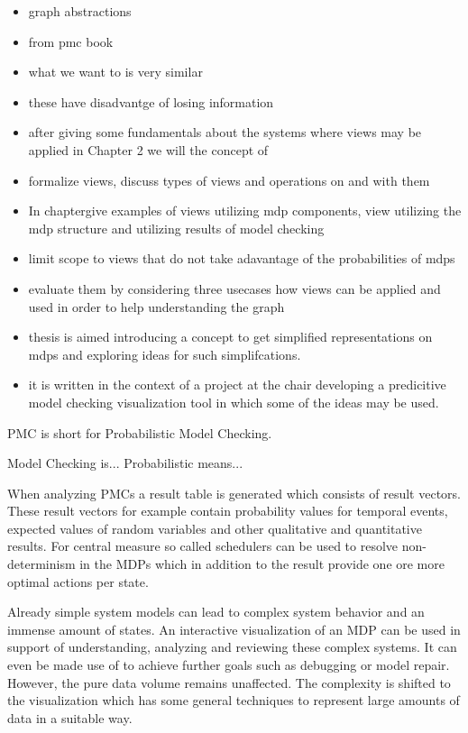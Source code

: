 \documentclass[preview]{standalone}
\begin{document}
\begin{itemize}
			\item graph abstractions
			\item from pmc book
			\item what we want to is very similar
			\item these have disadvantge of losing information
			\item after giving some fundamentals about the systems where views may be applied in Chapter 2 we will the concept of
			\item formalize views, discuss types of views and operations on and with them 
			\item  In chaptergive examples of views utilizing mdp components, view utilizing the mdp structure and utilizing results of model checking
			\item limit scope to views that do not take adavantage of the probabilities of mdps
			\item evaluate them by considering three usecases how views can be applied and used in order to help understanding the graph
			\item thesis is aimed introducing a concept to get simplified representations on mdps and exploring ideas for such simplifcations.
			\item it is written in the context of a project at the chair developing a predicitive model checking visualization tool in which some of the ideas may be used.
			
		\end{itemize}
		
		
		
		PMC is short for Probabilistic Model Checking.
		
		Model Checking is...
		Probabilistic means...
		
		When analyzing PMCs a result table is generated which consists of result vectors. These result vectors for example contain probability values for temporal events, expected values of random variables and other qualitative and quantitative results. For central measure so called schedulers can be used to resolve non-determinism in the MDPs which in addition to the result provide one ore more optimal actions per state.
		
		Already simple system models can lead to complex system behavior and an immense amount of states. An interactive visualization of an MDP can be used in support of understanding, analyzing and reviewing these complex systems. It can even be made use of to achieve further goals such as debugging or model repair. However, the pure data volume remains unaffected. The complexity is shifted to the visualization which has some general techniques to represent large amounts of data in a suitable way.
		
\end{document}
